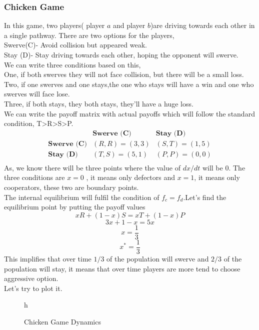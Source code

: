 \documentclass{article}
\begin{document}
\subsubsection{Chicken Game}
In this game, two players( player $a$ and player $b$)are driving towards each other in a single pathway. There are two options for the players,\\
Swerve(C)- Avoid collision but appeared weak.\\
Stay (D)- Stay driving towards each other, hoping the opponent will swerve.\\
We can write three conditions based on this,\\
One, if both swerves they will not face collision, but there will be a small loss.\\
Two, if one swerves and one stays,the one who stays will have a win and one who swerves will face lose.\\
Three, if both stays, they both stays, they'll have a huge loss.\\
We can write the payoff matrix with actual payoffs which will follow the standard condition, T>R>S>P.\\
\[
\begin{array}{c|cc}
   & \textbf{Swerve (C)} & \textbf{Stay (D)} \\
  \hline
  \textbf{Swerve (C)} & (R, R) = (3,3) & (S, T) = (1,5) \\
  \textbf{Stay (D)} & (T, S) = (5,1) & (P, P) = (0,0) \\
\end{array}
\]
As, we know there will be three points where the value of $dx/dt$ will be $0$. The three conditions are $x=0$ , it means only defectors and $x=1$, it means only cooperators, these two are boundary points.\\
The internal equilibrium will fulfil the condition of $f_c=f_d$.Let's find the equilibrium point by putting the payoff values\\
\[xR+(1-x)S=xT+(1-x)P\]
\[3x+1-x=5x\]
\[x=\frac{1}{3}\]
\[x^*=\frac{1}{3}\]
This implifies that over time $1/3$ of the population will swerve and $2/3$ of the population will stay, it means that over time players are more tend to choose aggressive option.\\
Let's try to plot it.\\
\begin{figure}{h}
    \centering
    \caption{Chicken Game Dynamics}
    \label{fig: Replicator dynamics for Chicken Game}
\end{figure}
\end{document}
